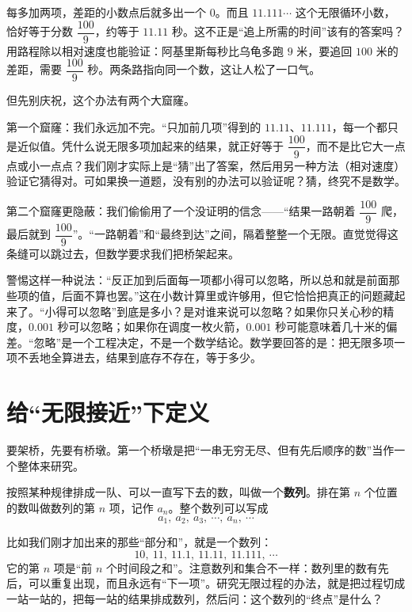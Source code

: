 每多加两项，差距的小数点后就多出一个 $0$。而且 $11.111\cdots$ 这个无限循环小数，恰好等于分数 $\dfrac{100}{9}$，约等于 $11.11$ 秒。这不正是“追上所需的时间”该有的答案吗？用路程除以相对速度也能验证：阿基里斯每秒比乌龟多跑 $9$ 米，要追回 $100$ 米的差距，需要 $\dfrac{100}{9}$ 秒。两条路指向同一个数，这让人松了一口气。

但先别庆祝，这个办法有两个大窟窿。

第一个窟窿：我们永远加不完。“只加前几项”得到的 $11.11$、$11.111$，每一个都只是近似值。凭什么说无限多项加起来的结果，就正好等于 $\dfrac{100}{9}$，而不是比它大一点点或小一点点？我们刚才实际上是“猜”出了答案，然后用另一种方法（相对速度）验证它猜得对。可如果换一道题，没有别的办法可以验证呢？猜，终究不是数学。

第二个窟窿更隐蔽：我们偷偷用了一个没证明的信念——“结果一路朝着 $\dfrac{100}{9}$ 爬，最后就到 $\dfrac{100}{9}$”。“一路朝着”和“最终到达”之间，隔着整整一个无限。直觉觉得这条缝可以跳过去，但数学要求我们把桥架起来。

\begin{fanli}
警惕这样一种说法：“反正加到后面每一项都小得可以忽略，所以总和就是前面那些项的值，后面不算也罢。”这在小数计算里或许够用，但它恰恰把真正的问题藏起来了。“小得可以忽略”到底是多小？是对谁来说可以忽略？如果你只关心秒的精度，$0.001$ 秒可以忽略；如果你在调度一枚火箭，$0.001$ 秒可能意味着几十米的偏差。“忽略”是一个工程决定，不是一个数学结论。数学要回答的是：把无限多项一项不丢地全算进去，结果到底存不存在，等于多少。
\end{fanli}

\section{给“无限接近”下定义}

要架桥，先要有桥墩。第一个桥墩是把“一串无穷无尽、但有先后顺序的数”当作一个整体来研究。

\begin{dingyi}[数列]
按照某种规律排成一队、可以一直写下去的数，叫做一个\textbf{数列}。排在第 $n$ 个位置的数叫做数列的第 $n$ 项，记作 $a_n$。整个数列可以写成
\[
a_1,\ a_2,\ a_3,\ \cdots,\ a_n,\ \cdots
\]
\end{dingyi}

比如我们刚才加出来的那些“部分和”，就是一个数列：
\[
10,\ 11,\ 11.1,\ 11.11,\ 11.111,\ \cdots
\]
它的第 $n$ 项是“前 $n$ 个时间段之和”。注意数列和集合不一样：数列里的数有先后，可以重复出现，而且永远有“下一项”。研究无限过程的办法，就是把过程切成一站一站的，把每一站的结果排成数列，然后问：这个数列的“终点”是什么？


